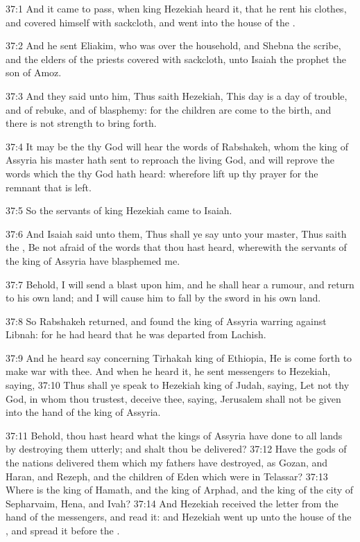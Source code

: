 37:1 And it came to pass, when king Hezekiah heard it, that he rent his clothes, and covered himself with sackcloth, and went into the house of the \LORD.

37:2 And he sent Eliakim, who was over the household, and Shebna the scribe, and the elders of the priests covered with sackcloth, unto Isaiah the prophet the son of Amoz.

37:3 And they said unto him, Thus saith Hezekiah, This day is a day of trouble, and of rebuke, and of blasphemy: for the children are come to the birth, and there is not strength to bring forth.

37:4 It may be the \LORD thy God will hear the words of Rabshakeh, whom the king of Assyria his master hath sent to reproach the living God, and will reprove the words which the \LORD thy God hath heard: wherefore lift up thy prayer for the remnant that is left.

37:5 So the servants of king Hezekiah came to Isaiah.

37:6 And Isaiah said unto them, Thus shall ye say unto your master, Thus saith the \LORD, Be not afraid of the words that thou hast heard, wherewith the servants of the king of Assyria have blasphemed me.

37:7 Behold, I will send a blast upon him, and he shall hear a rumour, and return to his own land; and I will cause him to fall by the sword in his own land.

37:8 So Rabshakeh returned, and found the king of Assyria warring against Libnah: for he had heard that he was departed from Lachish.

37:9 And he heard say concerning Tirhakah king of Ethiopia, He is come forth to make war with thee. And when he heard it, he sent messengers to Hezekiah, saying, 37:10 Thus shall ye speak to Hezekiah king of Judah, saying, Let not thy God, in whom thou trustest, deceive thee, saying, Jerusalem shall not be given into the hand of the king of Assyria.

37:11 Behold, thou hast heard what the kings of Assyria have done to all lands by destroying them utterly; and shalt thou be delivered?  37:12 Have the gods of the nations delivered them which my fathers have destroyed, as Gozan, and Haran, and Rezeph, and the children of Eden which were in Telassar?  37:13 Where is the king of Hamath, and the king of Arphad, and the king of the city of Sepharvaim, Hena, and Ivah?  37:14 And Hezekiah received the letter from the hand of the messengers, and read it: and Hezekiah went up unto the house of the \LORD, and spread it before the \LORD.

